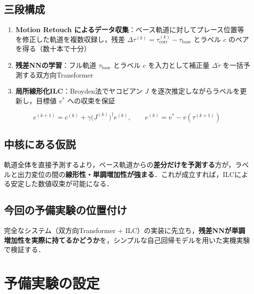 \documentclass[a4paper,10pt]{jlreq}
\begin{document}
\subsection{三段構成}

\begin{enumerate}
  \item \textbf{Motion Retouch によるデータ収集}：ベース軌道に対してプレース位置等を修正した軌道を複数収録し，残差 $\Delta\tau^{(k)} = \tau^{(k)}_\mathrm{corr} - \tau_\mathrm{base}$ とラベル $c$ のペアを得る（数十本で十分）
  \item \textbf{残差NNの学習}：フル軌道 $\tau_\mathrm{base}$ とラベル $c$ を入力として補正量 $\Delta\tilde{\tau}$ を一括予測する双方向Transformer
  \item \textbf{局所線形化ILC}：Broyden法でヤコビアン $J$ を逐次推定しながらラベルを更新し，目標値 $v^*$ への収束を保証
\end{enumerate}

$$c^{(k+1)} = c^{(k)} + \gamma \bigl(J^{(k)}\bigr)^\dagger e^{(k)}, \qquad e^{(k)} = v^* - v\!\left(\tau^{(k+1)}\right)$$

\subsection{中核にある仮説}

軌道全体を直接予測するより，ベース軌道からの\textbf{差分だけを予測する}方が，ラベルと出力変位の間の\textbf{線形性・単調増加性が強まる}．これが成立すれば，ILCによる安定した数値収束が可能になる．

\subsection{今回の予備実験の位置付け}

完全なシステム（双方向Transformer + ILC）の実装に先立ち，\textbf{残差NNが単調増加性を実際に持てるかどうか}を，シンプルな自己回帰モデルを用いた実機実験で検証する．

\begin{center}
  \fboxsep=5pt
\end{center}

\clearpage

\section{予備実験の設定}
\end{document}
